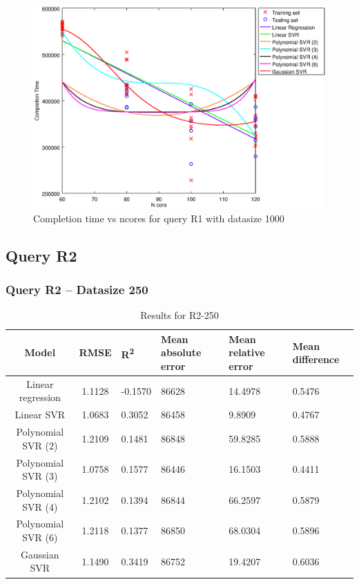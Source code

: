\documentclass[a4paper,11pt]{article}
\begin{document}
\begin {figure}[hbtp]
\centering
\includegraphics[width=\textwidth]{output/R1_1000_ONLY_1_LINEAR_NCORE/plot_R1_1000.eps}
\caption{Completion time vs ncores for query R1 with datasize 1000}
\label{fig:coreonly_linear_R1_1000}
\end {figure}

\newpage
\subsection{Query R2}
\subsubsection{Query R2 -- Datasize 250}
\begin{table}[H]
	\centering
	\begin{adjustbox}{center}
		\begin{tabular}{c | c M{1.2cm} M{2.5cm} M{2.5cm} M{1.8cm}}
			Model & RMSE & R\textsuperscript{2} & Mean absolute error & Mean relative error & Mean difference \tabularnewline
			\hline
			Linear regression & 1.1128 & -0.1570 &  86628 & 14.4978 & 0.5476 \\
			Linear SVR & 1.0683 & 0.3052 &  86458 & 9.8909 & 0.4767 \\
			Polynomial SVR (2) & 1.2109 & 0.1481 &  86848 & 59.8285 & 0.5888 \\
			Polynomial SVR (3) & 1.0758 & 0.1577 &  86446 & 16.1503 & 0.4411 \\
			Polynomial SVR (4) & 1.2102 & 0.1394 &  86844 & 66.2597 & 0.5879 \\
			Polynomial SVR (6) & 1.2118 & 0.1377 &  86850 & 68.0304 & 0.5896 \\
			Gaussian SVR & 1.1490 & 0.3419 &  86752 & 19.4207 & 0.6036 \\
		\end{tabular}
	\end{adjustbox}
	\\
	\caption{Results for R2-250}
	\label{fig:coreonly_linear_R2_250}
\end{table}
\end{document}
